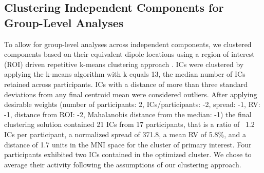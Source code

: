 \subsection{Clustering Independent Components for Group-Level Analyses}
To allow for group-level analyses across independent components, we clustered components based on their equivalent dipole locations using a region of interest (ROI) driven repetitive k-means clustering approach \cite{Gramann2018}. ICs were clustered by applying the k-means algorithm with k equals 13, the median number of ICs retained across participants. ICs with a distance of more than three standard deviations from any final centroid mean were considered outliers. After applying desirable weights (number of participants: 2, ICs/participants: -2, spread: -1, RV: -1, distance from ROI: -2, Mahalanobis distance from the median: -1) the final clustering solution contained 21 ICs from 17 participants, that is a ratio of ~1.2 ICs per participant, a normalized spread of 371.8, a mean RV of 5.8\%, and a distance of 1.7 units in the MNI space for the cluster of primary interest. Four participants exhibited two ICs contained in the optimized cluster. We chose to average their activity following the assumptions of our clustering approach.


